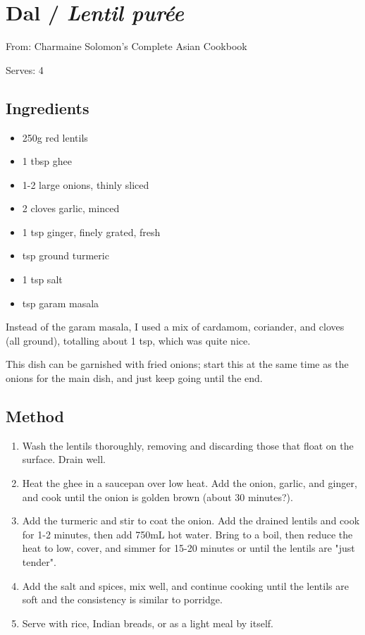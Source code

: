 \section{Dal / \emph{Lentil pur\'{e}e}}


From: Charmaine Solomon's Complete Asian Cookbook

Serves: 4

\subsection{Ingredients}

\begin{itemize}
	\item 250g red lentils
	\item 1 tbsp ghee
	\item 1-2 large onions, thinly sliced
	\item 2 cloves garlic, minced
	\item 1 tsp ginger, finely grated, fresh
	\item {} tsp ground turmeric
	\item 1 tsp salt
	\item {} tsp garam masala
\end{itemize}

Instead of the garam masala, I used a mix of cardamom, coriander, and cloves (all ground), totalling about 1 tsp, which was quite nice.

This dish can be garnished with fried onions; start this at the same time as the onions for the main dish, and just keep going until the end.

\subsection{Method}

\begin{enumerate}
	\item Wash the lentils thoroughly, removing and discarding those that float on the surface. Drain well.
	\item Heat the ghee in a saucepan over low heat. Add the onion, garlic, and ginger, and cook until the onion is golden brown (about 30 minutes?).
	\item Add the turmeric and stir to coat the onion. Add the drained lentils and cook for 1-2 minutes, then add 750mL hot water. Bring to a boil, then reduce the heat to low, cover, and simmer for 15-20 minutes or until the lentils are "just tender".
	\item Add the salt and spices, mix well, and continue cooking until the lentils are soft and the consistency is similar to porridge.
	\item Serve with rice, Indian breads, or as a light meal by itself.
\end{enumerate}
